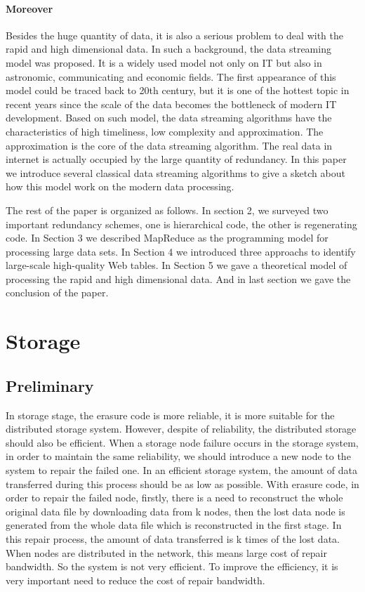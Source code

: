 \documentclass{article} %
\begin{document}
\paragraph{Moreover} Besides the huge quantity of data, it is also a serious problem to deal with the rapid and high dimensional data. In such a background, the data streaming model was proposed. It is a widely used model not only on IT but also in astronomic, communicating and economic fields. The first appearance of this model could be traced back to 20th century, but it is one of the hottest topic in recent years since the scale of the data becomes the bottleneck of modern IT development. Based on such model, the data streaming algorithms have the characteristics of high timeliness, low complexity and approximation. The approximation is the core of the data streaming algorithm. The real data in internet is actually occupied by the large quantity of redundancy. In this paper we introduce several classical data streaming algorithms to give a sketch about how this model work on the modern data processing.

The rest of the paper is organized as follows. In section 2, we surveyed two important redundancy schemes, one is hierarchical code, the other is regenerating code. In Section 3 we described MapReduce as the programming model for processing large data sets. In Section 4 we introduced three approachs to identify large-scale high-quality Web tables. In Section 5 we gave a theoretical model of processing the rapid and high dimensional data. And in last section we gave the conclusion of the paper.

\section{Storage}
\subsection{Preliminary}
In storage stage, the erasure code is more reliable, it is more suitable for the distributed storage system. However, despite of reliability, the distributed storage should also be efficient. When a storage node failure occurs in the storage system, in order to maintain the same reliability, we should introduce a new node to the system to repair the failed one. In an efficient storage system, the amount of data transferred during this process should be as low as possible. With erasure code, in order to repair the failed node, firstly, there is a need to reconstruct the whole original data file by downloading data from k nodes, then the lost data node is generated from the whole data file which is reconstructed in the first stage. In this repair process, the amount of data transferred is k times of the lost data. When nodes are distributed in the network, this means large cost of repair bandwidth. So the system is not very efficient. To improve the efficiency, it is very important need to reduce the cost of repair bandwidth.
\end{document}
